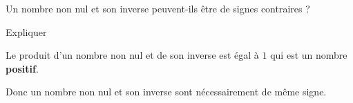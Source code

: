 \begin{exercice*}
    Un nombre non nul et son inverse peuvent-ils être de signes contraires ?
    
    Expliquer
\end{exercice*}
\begin{corrige}
    Le produit d'un nombre non nul et de son inverse est égal à $1$ qui est un nombre \textbf{positif}.

    Donc un nombre non nul et son inverse sont nécessairement de même signe.
\end{corrige}

